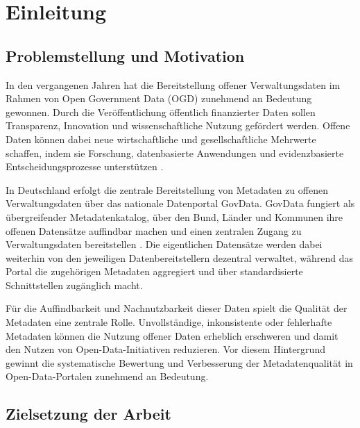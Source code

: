 \chapter{Einleitung}

\section{Problemstellung und Motivation}

In den vergangenen Jahren hat die Bereitstellung offener Verwaltungsdaten im Rahmen von Open Government Data (OGD) zunehmend an Bedeutung gewonnen. Durch die Veröffentlichung öffentlich finanzierter Daten sollen Transparenz, Innovation und wissenschaftliche Nutzung gefördert werden. Offene Daten können dabei neue wirtschaftliche und gesellschaftliche Mehrwerte schaffen, indem sie Forschung, datenbasierte Anwendungen und evidenzbasierte Entscheidungsprozesse unterstützen \cite{lnenicka2023}.

In Deutschland erfolgt die zentrale Bereitstellung von Metadaten zu offenen Verwaltungsdaten über das nationale Datenportal GovData. GovData fungiert als übergreifender Metadatenkatalog, über den Bund, Länder und Kommunen ihre offenen Datensätze auffindbar machen und einen zentralen Zugang zu Verwaltungsdaten bereitstellen \cite{govdata_portal, FitkoGovdata}. Die eigentlichen Datensätze werden dabei weiterhin von den jeweiligen Datenbereitstellern dezentral verwaltet, während das Portal die zugehörigen Metadaten aggregiert und über standardisierte Schnittstellen zugänglich macht.

Für die Auffindbarkeit und Nachnutzbarkeit dieser Daten spielt die Qualität der Metadaten eine zentrale Rolle. Unvollständige, inkonsistente oder fehlerhafte Metadaten können die Nutzung offener Daten erheblich erschweren und damit den Nutzen von Open-Data-Initiativen reduzieren. Vor diesem Hintergrund gewinnt die systematische Bewertung und Verbesserung der Metadatenqualität in Open-Data-Portalen zunehmend an Bedeutung.

\section{Zielsetzung der Arbeit}
\label{sec:zielsetzung}

